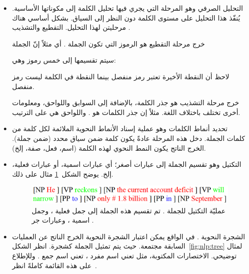 \begin{itemize}
	\item 

التحليل الصرفي  وهو المرحلة التي يجري فيها تحليل الكلمة إلى مكوناتها الأساسية.
يُنفّذ هذا التحليل على مستوى الكلمة دون النظر إلى السياق.
بشكل أساسي هناك مرحليتن لهذا التحليل. التقطيع  والتشذيب .

خرج مرحلة التقطيع هو الرموز التي تكون الجملة .
أي مثلاً إنّ الجملة \\
\centerline{  }
سيتم تقسيمها إلى خمس رموز وهي:\\
\centerline{  }
لاحظ أن النقطة الأخيرة تعتبر رمز منفصل بينما النقطة في الكلمة  ليست رمز منفصل.

خرج مرحلة التشذيب هو جذر الكلمة، بالإضافة إلى السوابق واللواحق، ومعلومات أخرى تختلف باختلاف اللغة.
مثلاً إن جذر الكلمات
هو .
واللواحق هي
على الترتيب.


\item
تحديد أنماط الكلمات  وهو عملية إسناد الأنماط النحوية الملائمة لكل كلمة من كلمات الجملة.
دخل هذه المرحلة عادةً يكون كلمة ضمن سياق محدد (ضمن جملة).
الخرج الناتج يكون النمط النحوي لهذه الكلمة (اسم، فعل، صفة، إلخ).

\item
التكتيل  وهو تقسيم الجملة إلى عبارات أصغر؛ أي عبارات اسمية، أو عبارات فعلية، إلخ.
يوضح الشكل~\ref{fig:nlp:chunking} مثال على ذلك.

 \begin{figure}[htb]
	\centering
	\includegraphics[width=0.7\linewidth]{images/nlp-chunking2.PNG}
	\caption[%
		مثال عن عملية التكتيل.
	]{%
		عمليّة التكتيل للجملة
		. تم تقسيم هذه الجملة إلى جمل فعلية
		، وجمل اسمية
		، وعبارات جر
		.
	}
	\label{fig:nlp:chunking}
\end{figure}

\item
الشجرة النحوية .
في الواقع يمكن اعتبار الشجرة النحوية الخرج الناتج عن العمليات السابقة مجتمعة.
حيث يتم تمثيل الجملة كشجرة.
انظر الشكل~\ref{fig:nlp:tree} لمثال توضيحي.
الاختصارات المكتوبة،
مثل  تعني اسم مفرد ،
تعني اسم جمع .
وللإطلاع على هذه القائمة كاملةً انظر~\cite{penntreebank}.



\end{itemize}
